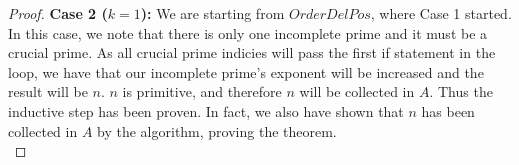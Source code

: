 \documentclass[../paper.tex]{subfiles}
\begin{document}
\begin{proof}
\textbf{Case 2 ($k = 1$):} We are starting from $OrderDelPos$,
where Case 1 started. In this case, we note that there is
only one incomplete prime and it must be a crucial prime.
As all crucial prime indicies will pass the first if statement in the 
loop, we have that our incomplete prime's exponent will be 
increased and the result will be $n$. $n$ is primitive, and
therefore $n$ will be collected in $A$. Thus the inductive step has 
been proven. In fact, we also have shown that $n$ has been
collected in $A$ by the algorithm, proving the theorem.
\\

\end{proof}









\end{document}
